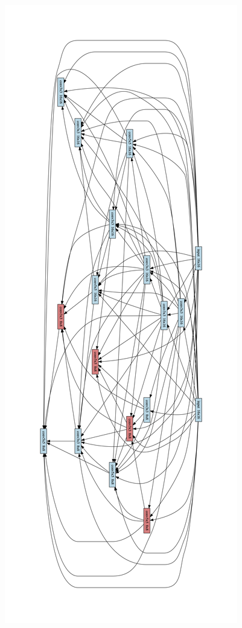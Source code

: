 \begin{figure}[h]
\iflatexml
\includegraphics[width=6\linewidth]{figures/graph_642261663860860599_cell_1.png}

\end{figure}
